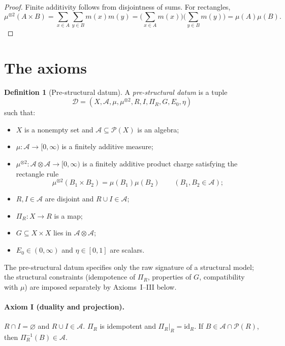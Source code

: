 \documentclass[11pt]{article}
\numberwithin{equation}{section}
\theoremstyle{definition}
\newtheorem{definition}[theorem]{Definition}
\begin{document}
\begin{proof}
Finite additivity follows from disjointness of sums. For rectangles,
\[
\mu^{\otimes2}(A\times B)=\sum_{x\in A}\sum_{y\in B} m(x)m(y)
=\Big(\sum_{x\in A}m(x)\Big)\Big(\sum_{y\in B}m(y)\Big)=\mu(A)\mu(B).
\]
\end{proof}


\section{The axioms}\label{sec:axioms}

\begin{definition}[Pre-structural datum]\label{def:structural-datum}
A \emph{pre-structural datum} is a tuple
\[
\mathcal D=(X,\allowbreak \mathcal A,\allowbreak \mu,\allowbreak \mu^{\otimes2},\allowbreak R,\allowbreak I,\allowbreak \Pi_R,\allowbreak G,\allowbreak E_0,\allowbreak \eta)
\]
such that:
\begin{itemize}[nosep]
  \item $X$ is a nonempty set and $\mathcal A\subseteq\mathcal P(X)$ is an algebra;
  \item $\mu:\mathcal A\to[0,\infty)$ is a finitely additive measure;
  \item $\mu^{\otimes2}:\mathcal A\otimes\mathcal A\to[0,\infty)$ is a finitely additive product charge satisfying the rectangle rule
  \[
  \mu^{\otimes2}(B_1\times B_2)=\mu(B_1)\mu(B_2)\qquad(B_1,B_2\in\mathcal A);
  \]
  \item $R,I\in\mathcal A$ are disjoint and $R\cup I\in\mathcal A$;
  \item $\Pi_R:X\to R$ is a map;
  \item $G\subseteq X\times X$ lies in $\mathcal A\otimes\mathcal A$;
  \item $E_0\in(0,\infty)$ and $\eta\in[0,1]$ are scalars.
\end{itemize}
The pre-structural datum specifies only the raw signature of a structural model; the structural constraints (idempotence of $\Pi_R$, properties of $G$, compatibility with $\mu$) are imposed separately by Axioms~I--III below.
\end{definition}

\paragraph{Axiom I (duality and projection).}
$R\cap I=\varnothing$ and $R\cup I\in\mathcal A$.
$\Pi_R$ is idempotent and $\Pi_R|_R=\mathrm{id}_R$.
If $B\in\mathcal A\cap\mathcal P(R)$, then $\Pi_R^{-1}(B)\in\mathcal A$.
\end{document}
